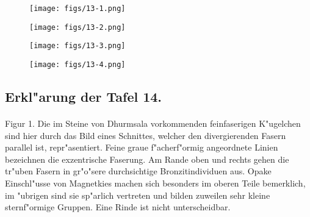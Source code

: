 \documentclass[a4paper, 11pt, oneside, polutonikogreek, german]{article}
\begin{document}
\vspace*{\fill}
\begin{figure}[H]
\centering
\texttt{[image: figs/13-1.png]}
\caption{}
\end{figure}
\vspace*{\fill}
\clearpage

\vspace*{\fill}
\begin{figure}[H]
\centering
\texttt{[image: figs/13-2.png]}
\caption{}
\end{figure}
\vspace*{\fill}
\clearpage

\vspace*{\fill}
\begin{figure}[H]
\centering
\texttt{[image: figs/13-3.png]}
\caption{}
\end{figure}
\vspace*{\fill}
\clearpage

\vspace*{\fill}
\begin{figure}[H]
\centering
\texttt{[image: figs/13-4.png]}
\caption{}
\end{figure}
\vspace*{\fill}
\clearpage

\subsection{Erkl"arung der Tafel 14.}
\paragraph{}
Figur 1. Die im Steine von Dhurmsala vorkommenden feinfaserigen K"ugelchen sind hier durch das Bild eines Schnittes, welcher den divergierenden Fasern parallel ist, repr"asentiert. Feine graue f"acherf"ormig angeordnete Linien bezeichnen die exzentrische Faserung. Am Rande oben und rechts gehen die tr"uben Fasern in gr"o"sere durchsichtige Bronzitindividuen aus. Opake Einschl"usse von Magnetkies machen sich besonders im oberen Teile bemerklich, im "ubrigen sind sie sp"arlich vertreten und bilden zuweilen sehr kleine sternf"ormige Gruppen. Eine Rinde ist nicht unterscheidbar.
\end{document}
